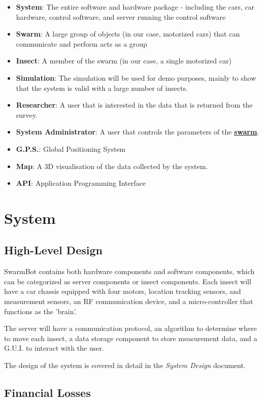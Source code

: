 \documentclass[11pt]{article}
\begin{document}
\begin{itemize}
\item \textbf{System}: The entire software and hardware package - including the cars,
car hardware, control software, and server running the control software
\item \textbf{Swarm}: A large group of objects (in our case, motorized cars) that can communicate and perform acts as a group
\item \textbf{Insect}: A member of the swarm (in our case, a single motorized car)
\item \textbf{Simulation}: The simulation will be used for demo purposes, mainly to show that
the system is valid with a large number of insects.
\item \textbf{Researcher}: A user that is interested in the data that is returned from the survey.
\item \textbf{System Administrator}: A user that controls the parameters of the \hyperref[sec:definitions]{\textbf{swarm}}.
\item \textbf{G.P.S.}: Global Positioning System
\item \textbf{Map}: A 3D visualisation of the data collected by the system.
\item \textbf{API}: Application Programming Interface
\end{itemize}

\section{System}
\subsection{High-Level Design}

SwarmBot contains both hardware components and software components, which can be categorized as
server components or insect components. Each insect will have a car chassis equipped with four motors,
location tracking sensors, and measurement sensors, an RF communication device, and a micro-controller
that functions as the 'brain'.

The server will have a communication protocol, an algorithm to determine where to move each insect,
a data storage component to store measurement data, and a G.U.I. to interact with the user.

The design of the system is covered in detail in the \textit{System Design} document.

\subsection{Financial Losses}
\end{document}
